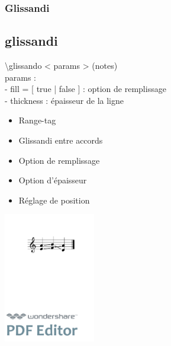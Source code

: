 \documentclass[12pt]{beamer}
\newenvironment{code}
  {\fontfamily{prc}\selectfont}{}
\begin{document}
    \begin{frame}
    \frametitle{Glissandi}
    \subsection{glissandi}
    
    \begin{code} \textbackslash{}glissando \textless{} params \textgreater{} (notes)\\ 
    \hspace{2mm} params :\\
      - fill = [ true | false ] : option de remplissage\\
      - thickness : épaisseur de la ligne
    \end{code}
    
    \vspace{5mm}
    
    \begin{multicols}{2}
    
    \begin{itemize}
      \item Range-tag
      \item Glissandi entre accords
      \item Option de remplissage
      \item Option d'épaisseur
      \item Réglage de position
    \end{itemize}
    
    \columnbreak
    
    \includegraphics[width=4cm]{img/glissandosimple.pdf}
    
    \end{multicols}
    
    \end{frame}

\end{document}
